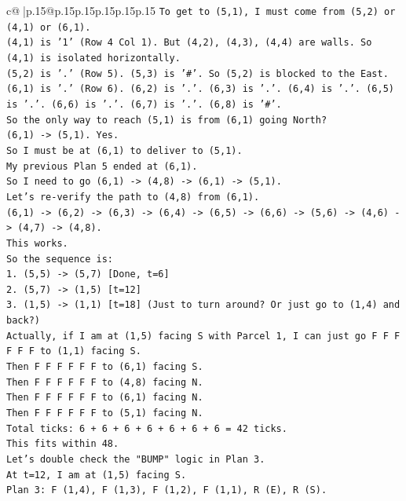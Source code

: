\documentclass{article}
\begin{document}
{\begin{supertabular}{c@{$\;$}|p{.15\linewidth}@{}p{.15\linewidth}p{.15\linewidth}p{.15\linewidth}p{.15\linewidth}p{.15\linewidth}}
{{{\texttt{To get to (5,1), I must come from (5,2) or (4,1) or (6,1).} \\
\texttt{(4,1) is '1' (Row 4 Col 1). But (4,2), (4,3), (4,4) are walls. So (4,1) is isolated horizontally.} \\
\texttt{(5,2) is '.' (Row 5). (5,3) is '\#'. So (5,2) is blocked to the East.} \\
\texttt{(6,1) is '.' (Row 6). (6,2) is '.'. (6,3) is '.'. (6,4) is '.'. (6,5) is '.'. (6,6) is '.'. (6,7) is '.'. (6,8) is '\#'.} \\
\texttt{So the only way to reach (5,1) is from (6,1) going North?} \\
\texttt{(6,1) {-}> (5,1). Yes.} \\
\texttt{So I must be at (6,1) to deliver to (5,1).} \\
\texttt{My previous Plan 5 ended at (6,1).} \\
\texttt{So I need to go (6,1) {-}> (4,8) {-}> (6,1) {-}> (5,1).} \\
\texttt{Let's re{-}verify the path to (4,8) from (6,1).} \\
\texttt{(6,1) {-}> (6,2) {-}> (6,3) {-}> (6,4) {-}> (6,5) {-}> (6,6) {-}> (5,6) {-}> (4,6) {-}> (4,7) {-}> (4,8).} \\
\texttt{This works.} \\
\texttt{So the sequence is:} \\
\texttt{1. (5,5) {-}> (5,7) {[}Done, t=6{]}} \\
\texttt{2. (5,7) {-}> (1,5) {[}t=12{]}} \\
\texttt{3. (1,5) {-}> (1,1) {[}t=18{]} (Just to turn around? Or just go to (1,4) and back?)} \\
\texttt{Actually, if I am at (1,5) facing S with Parcel 1, I can just go F F F F F F to (1,1) facing S.} \\
\texttt{Then F F F F F F to (6,1) facing S.} \\
\texttt{Then F F F F F F to (4,8) facing N.} \\
\texttt{Then F F F F F F to (6,1) facing N.} \\
\texttt{Then F F F F F F to (5,1) facing N.} \\
\texttt{Total ticks: 6 + 6 + 6 + 6 + 6 + 6 + 6 = 42 ticks.} \\
\texttt{This fits within 48.} \\
\texttt{Let's double check the "BUMP" logic in Plan 3.} \\
\texttt{At t=12, I am at (1,5) facing S.} \\
\texttt{Plan 3: F (1,4), F (1,3), F (1,2), F (1,1), R (E), R (S).} \\
}}}
\end{supertabular}}
\end{document}
